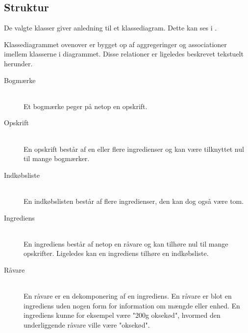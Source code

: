 \subsection{Struktur}

De valgte klasser giver anledning til et klassediagram. Dette kan ses i . 



Klassediagrammet ovenover er bygget op af aggregeringer og associationer imellem klasserne i diagrammet. Disse relationer er ligeledes beskrevet tekstuelt herunder.

\begin{description}
  \item[Bogmærke] \hfill \\
    Et bogmærke peger på netop en opskrift.

  \item[Opskrift] \hfill \\
    En opskrift består af en eller flere ingredienser og kan være tilknyttet nul til mange bogmærker.

\item[Indkøbsliste] \hfill \\
  En indkøbslisten består af flere ingredienser, den kan dog også være tom.

\item[Ingrediens] \hfill \\
  En ingrediens består af netop en råvare og kan tilhøre nul til mange opskrifter. Ligeledes kan en ingrediens tilhøre en indkøbsliste.

\item[Råvare] \hfill \\
  En råvare er en dekomponering af en ingrediens. En råvare er blot en ingrediens uden nogen form for information om mængde eller enhed. En ingrediens kunne for eksempel være "200g oksekød", hvormed den underliggende råvare ville være "oksekød".
\end{description}


